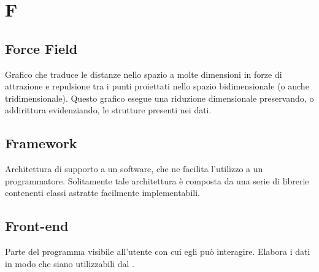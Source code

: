 \section*{F}
\markright{}

\subsection*{Force Field}
Grafico che traduce le distanze nello spazio a molte dimensioni in forze di attrazione e repulsione tra i punti proiettati nello spazio bidimensionale (o anche tridimensionale). Questo grafico esegue una riduzione dimensionale preservando, o addirittura evidenziando, le strutture presenti nei dati.

\subsection*{Framework}
Architettura di supporto a un software, che ne facilita l'utilizzo a un programmatore. Solitamente tale architettura è composta da una serie di librerie contenenti classi astratte facilmente implementabili. 

\subsection*{Front-end}
Parte del programma visibile all'utente con cui egli può interagire. Elabora i dati in modo che siano utilizzabili dal .
